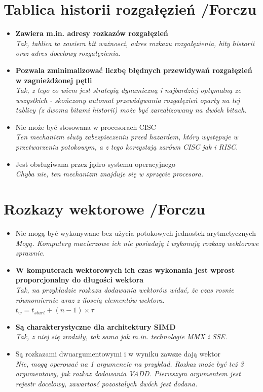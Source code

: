 \documentclass[a4paper,twoside]{article}
\begin{document}
\section{Tablica historii rozgałęzień {\small /Forczu}}
	\begin{itemize}
    \item \textbf{Zawiera m.in. adresy rozkazów rozgałęzień}\\
    {\small \emph{Tak, tablica ta zawiera bit ważnosci, \emph{adres rozkazu rozgałęzienia}, bity historii oraz \emph{adres docelowy rozgałęzienia}.}}
    \item \textbf{Pozwala zminimalizować liczbę błędnych przewidywań rozgałęzień w zagnieżdżonej pętli}\\
    {\small \emph{Tak, z tego co wiem jest strategią dynamiczną i najbardziej optymalną ze wszystkich - skończony automat przewidywania rozgałęzień oparty na tej tablicy (z dwoma bitami historii) może być zarealizowany na dwóch bitach.}}
    \item Nie może być stosowana w procesorach CISC\\
    {\small \emph{Ten mechanizm służy zabezpieczeniu przed hazardem, który występuje w przetwarzeniu potokowym, a z tego korzystają zarówn CISC jak i RISC.}}
    \item Jest obsługiwana przez jądro systemu operacyjnego\\
    {\small \emph{Chyba nie, ten mechanizm znajduje się w sprzęcie procesora.}}
    \end{itemize}

\section{Rozkazy wektorowe {\small /Forczu}}
	\begin{itemize}
    \item Nie mogą być wykonywane bez użycia potokowych jednostek arytmetycznych\\
    {\small \emph{Mogą. Komputery macierzowe ich nie posiadają i wykonują rozkazy wektorowe sprawnie.}}
    \item \textbf{W komputerach wektorowych ich czas wykonania jest wprost proporcjonalny do długości wektora}\\
    {\small \emph{Tak, na przykładzie rozkazu dodawania wektorów widać, że czas rosnie równomiernie wraz z iloscią elementów wektora.\\
    $t_{w}=t_{start}+(n-1)\times\tau$}}
    \item \textbf{Są charakterystyczne dla architektury SIMD}\\
    {\small \emph{Tak, z niej się zrodziły, tak samo jak m.in. technologie MMX i SSE.}}
    \item Są rozkazami dwuargumentowymi i w wyniku zawsze dają wektor\\
    {\small \emph{Nie, mogą operować na 1 argumencie na przykład. Rozkaz może być też 3 argumentowy, jak rozkaz dodawania VADD. Pierwszym argumentem jest rejestr docelowy, zawartosć pozostałych dwóch jest dodana.}}
    \end{itemize}
\end{document}
